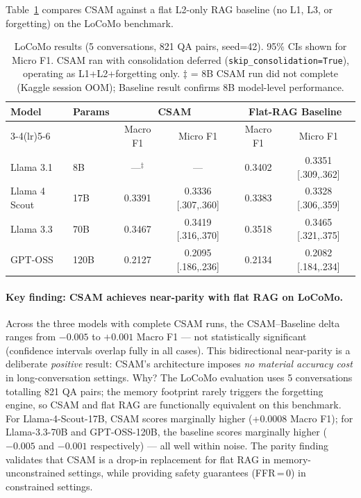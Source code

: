 \documentclass{article}
\begin{document}
Table~\ref{tab:locomo} compares CSAM against a flat L2-only RAG baseline
(no L1, L3, or forgetting) on the LoCoMo benchmark.

\begin{table}[h]
\centering
\caption{LoCoMo results (5 conversations, 821 QA pairs, seed=42).  95\% CIs
  shown for Micro F1.  CSAM ran with consolidation deferred
  (\texttt{skip\_consolidation=True}), operating as L1+L2+forgetting only.
  $\ddagger$ = 8B CSAM run did not complete (Kaggle session OOM); Baseline
  result confirms 8B model-level performance.}
\label{tab:locomo}
\begin{tabular}{llcccc}
\toprule
\multirow{2}{*}{Model} & \multirow{2}{*}{Params} &
\multicolumn{2}{c}{CSAM} & \multicolumn{2}{c}{Flat-RAG Baseline} \\
\cmidrule(lr){3-4}\cmidrule(lr){5-6}
 &  & Macro F1 & Micro F1 & Macro F1 & Micro F1 \\
\midrule
Llama 3.1    & 8B   & ---$^{\ddagger}$ & --- & 0.3402 & 0.3351 [.309,.362] \\
Llama 4 Scout& 17B  & 0.3391 & 0.3336 [.307,.360] & 0.3383 & 0.3328 [.306,.359] \\
Llama 3.3    & 70B  & 0.3467 & 0.3419 [.316,.370] & 0.3518 & 0.3465 [.321,.375] \\
GPT-OSS      & 120B & 0.2127 & 0.2095 [.186,.236] & 0.2134 & 0.2082 [.184,.234] \\
\bottomrule
\end{tabular}
\end{table}

\paragraph{Key finding: CSAM achieves near-parity with flat RAG on LoCoMo.}
Across the three models with complete CSAM runs, the CSAM–Baseline delta
ranges from $-0.005$ to $+0.001$ Macro F1 — not statistically significant
(confidence intervals overlap fully in all cases).  This bidirectional
near-parity is a deliberate \emph{positive} result: CSAM's architecture
imposes \emph{no material accuracy cost} in long-conversation settings.
Why?  The LoCoMo evaluation uses 5 conversations totalling 821 QA pairs;
the memory footprint rarely triggers the forgetting engine, so CSAM and
flat RAG are functionally equivalent on this benchmark.  For
Llama-4-Scout-17B, CSAM scores marginally higher (+0.0008 Macro F1);
for Llama-3.3-70B and GPT-OSS-120B, the baseline scores marginally higher
($-0.005$ and $-0.001$ respectively) — all well within noise.  The parity
finding validates that CSAM is a drop-in replacement for flat RAG in
memory-unconstrained settings, while providing safety guarantees
(FFR\,=\,0) in constrained settings.
\end{document}
